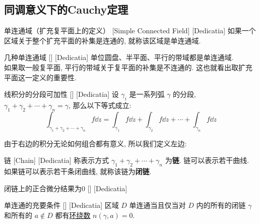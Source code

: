 \documentclass[UTF8]{ctexart}
\begin{document}
    \subsection{同调意义下的Cauchy定理}

        \begin{dfn}
            [UUID]
            {单连通域（扩充复平面上的定义）}
            [Simple Connected Field]
            [Dedicatia]
            如果一个区域关于整个扩充平面的补集是连通的, 就称该区域是单连通域. 
        \end{dfn}

        \begin{xmp}
            [UUID]
            {几种单连通域}
            []
            [Dedicatia]
            单位圆盘、半平面、平行的带域都是单连通域. \\
            如果取一般复平面, 平行的带域关于复平面的补集是不连通的. 这也就看出取扩充平面这一定义的重要性. 
        \end{xmp}

        \begin{ppt}
            [UUID]
            {线积分的分段可加性}
            []
            [Dedicatia]
            设 \(\gamma_i\) 是一系列弧 \(\gamma\) 的分段,  \(\gamma_1+\gamma_2+\cdots+\gamma_n=\gamma\), 那么以下等式成立: 
            \[\int_{\gamma_1+\gamma_2+\cdots+\gamma_n}f\dd{z}=\int_{\gamma_1}f\dd{z}+\int_{\gamma_2}f\dd{z}+\cdots+\int_{\gamma_n}f\dd{z}\]
        \end{ppt}

        由于右边的积分无论如何组合都有意义, 所以我们定义左边: 

        \begin{dfn}
            [UUID]
            {链}
            [Chain]
            [Dedicatia]
            称表示方式 \(\gamma_1+\gamma_2+\cdots+\gamma_n\) 为\textbf{链}. 链可以表示若干曲线. 如果链可以表示若干条闭曲线, 就称该链为\textbf{闭链}. 
        \end{dfn}

        \begin{ppt}
            [UUID]
            {闭链上的正合微分结果为0}
            []
            [Dedicatia]
        \end{ppt}

        \begin{thm}
            [UUID]
            {单连通的充要条件}
            []
            [Dedicatia]
            区域 \(D\) 单连通当且仅当对 \(D\) 内的所有的闭链 \(\gamma\) 和所有的 \(a\notin D\) 都有\hyperref[dfn:WindingNumber]{环绕数} \(n(\gamma,a)=0\).
        \end{thm}
\end{document}
